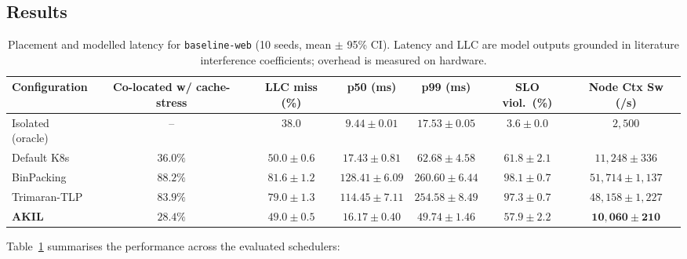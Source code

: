 \documentclass[10pt,conference,a4paper]{IEEEtran}
\newcommand{\akil}{\textsc{AKIL}\xspace}
\newcommand{\sys}{\akil}
\begin{document}
\subsection{Results}

\begin{table}[t]
\centering
\caption{Placement and modelled latency for \texttt{baseline-web} (10 seeds, mean $\pm$ 95\% CI). Latency and LLC are model outputs grounded in literature interference coefficients; overhead is measured on hardware.}
\label{tab:summary}
\renewcommand{\arraystretch}{1.15}
\begin{tabular}{lcccccc}
\toprule
\textbf{Configuration} & \textbf{Co-located w/ cache-stress} & \textbf{LLC miss (\%)} & \textbf{p50 (ms)} & \textbf{p99 (ms)} & \textbf{SLO viol.\ (\%)} & \textbf{Node Ctx Sw (/s)} \\
\midrule
Isolated (oracle)        & --        & $38.0$            & $9.44 \pm 0.01$   & $17.53 \pm 0.05$  & $3.6 \pm 0.0$  & $2{,}500$ \\
Default K8s              & $36.0\%$  & $50.0 \pm 0.6$    & $17.43 \pm 0.81$  & $62.68 \pm 4.58$  & $61.8 \pm 2.1$ & $11{,}248 \pm 336$ \\
BinPacking               & $88.2\%$  & $81.6 \pm 1.2$    & $128.41 \pm 6.09$ & $260.60 \pm 6.44$ & $98.1 \pm 0.7$ & $51{,}714 \pm 1{,}137$ \\
Trimaran-TLP             & $83.9\%$  & $79.0 \pm 1.3$    & $114.45 \pm 7.11$ & $254.58 \pm 8.49$ & $97.3 \pm 0.7$ & $48{,}158 \pm 1{,}227$ \\
\textbf{\sys}            & $\mathbf{28.4\%}$  & $\mathbf{49.0 \pm 0.5}$    & $\mathbf{16.17 \pm 0.40}$  & $\mathbf{49.74 \pm 1.46}$  & $\mathbf{57.9 \pm 2.2}$ & $\mathbf{10{,}060 \pm 210}$ \\
\bottomrule
\end{tabular}
\end{table}

Table~\ref{tab:summary} summarises the performance across the evaluated schedulers:
\end{document}
